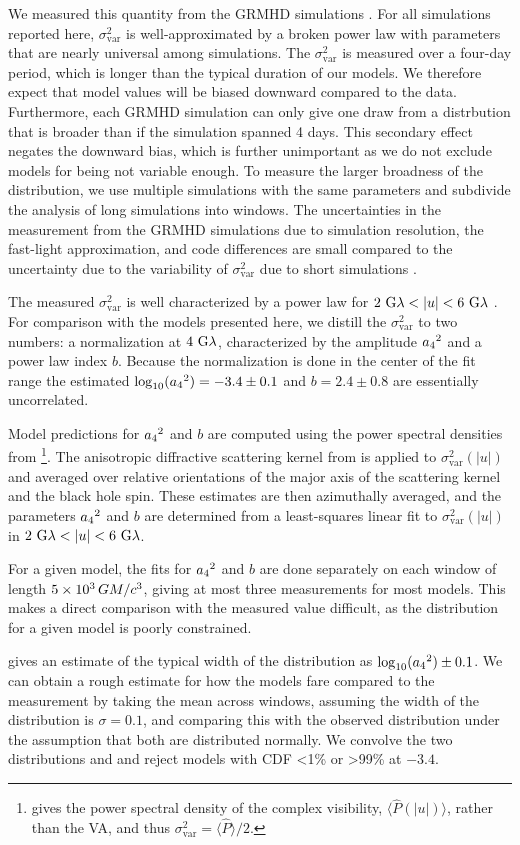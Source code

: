 We measured this quantity from the GRMHD simulations \citep[see][for details]{Georgiev_2022}.
For all simulations reported here, $\sigma_\text{var}^2$ is well-approximated by a broken power law with parameters that are nearly universal among simulations.
The $\sigma_\text{var}^2$ is measured over a four-day period, which is longer than the typical duration of our models.
We therefore expect that model values will be biased downward compared to the data. Furthermore, each GRMHD simulation can only give one draw from a distrbution that is broader than if the simulation spanned 4 days. This secondary effect negates the downward bias, which is further unimportant as we do not exclude models for being not variable enough. To measure the larger broadness of the distribution, we use multiple simulations with the same parameters and subdivide the analysis of long simulations into windows.
The uncertainties in the measurement from the GRMHD simulations due to simulation resolution, the fast-light approximation, and code differences are small compared to the uncertainty due to the variability of $\sigma_\text{var}^2$ due to short simulations \citep{Georgiev_2022}.

The measured $\sigma_\text{var}^2$ is well characterized by a power law for $2~{\rm G}\lambda < |u| < 6~{\rm G}\lambda$ \citep{Georgiev_2022}.
For comparison with the models presented here, we distill the $\sigma_{\text{var}}^2$ to two numbers: a normalization at $4~{\rm G}\lambda$, characterized by the amplitude ${a_4}^2$ and a power law index $b$.
Because the normalization is done in the center of the fit range the estimated $\log_{10}({a_4}^2) = -3.4 \pm 0.1$ and $b=2.4\pm0.8$ are essentially uncorrelated.

Model predictions for ${a_4}^2$ and $b$ are computed using the power spectral densities from \citet{Georgiev_2022}\footnote{\citet{Georgiev_2022} gives the power spectral density of the complex visibility, $\langle\hat{P}(|u|)\rangle$, rather than the VA, and thus $\sigma_\text{var}^2=\langle \hat{P}\rangle/2$.}.
The anisotropic diffractive scattering kernel from \citet{Johnson_2018} is applied to $\sigma_\text{var}^2(|u|)$ and averaged over relative orientations of the major axis of the scattering kernel and the black hole spin.
These estimates are then azimuthally averaged, and the parameters ${a_4}^2$ and $b$ are determined from a least-squares linear fit to $\sigma_\text{var}^2(|u|)$ in $2~{\rm G}\lambda < |u| < 6~{\rm G}\lambda$.

For a given model, the fits for ${a_4}^2$ and $b$ are done separately on each window of length $5 \times 10^3\,GM/c^3$, giving at most three measurements for most models.
This makes a direct comparison with the measured value difficult, as the distribution for a given model is poorly constrained.

\citet{Georgiev_2022} gives an estimate of the typical width of the distribution as $\log_{10}({a_4}^2) \pm 0.1$.
We can obtain a rough estimate for how the models fare compared to the measurement by taking the mean across windows, assuming the width of the distribution is $\sigma = 0.1$, and comparing this with the observed distribution under the assumption that both are distributed normally.
We convolve the two distributions and and reject models with CDF <1\% or >99\% at $-3.4$.
